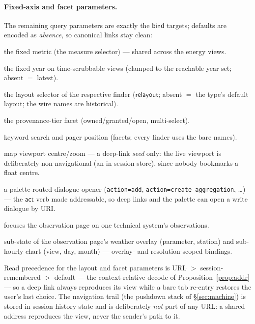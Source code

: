 \documentclass[11pt,a4paper]{article}
\theoremstyle{remark}
\newcommand{\vbind}{\mathsf{bind}}
\newcommand{\vrelayout}{\mathsf{relayout}}
\newcommand{\vact}{\mathsf{act}}
\begin{document}
\paragraph{Fixed-axis and facet parameters.} The remaining query parameters are
exactly the $\vbind$ targets; defaults are encoded as \emph{absence}, so
canonical links stay clean:

\begin{description}\setlength\itemsep{1pt}
\item[\texttt{m}] the fixed metric (the measure selector) --- shared across the
  energy views.
\item[\texttt{y}] the fixed year on time-scrubbable views (clamped to the
  reachable year set; absent $=$ latest).
\item[\texttt{view} / \texttt{space} / \texttt{guise}] the layout selector of the
  respective finder ($\vrelayout$; absent $=$ the type's default layout; the
  wire names are historical).
\item[\texttt{tiers}] the provenance-tier facet (owned/granted/open, multi-select).
\item[\texttt{q} / \texttt{offset}] keyword search and pager position (facets;
  every finder uses the bare names).
\item[\texttt{c} / \texttt{z}] map viewport centre/zoom --- a deep-link
  \emph{seed} only: the live viewport is deliberately non-navigational (an
  in-session store), since nobody bookmarks a float centre.
\item[\texttt{action}] a palette-routed dialogue opener (\texttt{action=add},
  \texttt{action=create-aggregation}, \ldots) --- the $\vact$ verb made
  addressable, so deep links and the palette can open a write dialogue by URI.
\item[\texttt{unit}] focuses the observation page on one technical system's
  observations.
\item[\texttt{wp} / \texttt{ws}; \texttt{tab} / \texttt{day} / \texttt{month}]
  sub-state of the observation page's weather overlay (parameter, station) and
  sub-hourly chart (view, day, month) --- overlay- and resolution-scoped
  bindings.
\end{description}

Read precedence for the layout and facet parameters is URL $>$ session-remembered
$>$ default --- the context-relative decode of Proposition~\ref{prop:addr} --- so
a deep link always reproduces its view while a bare tab re-entry restores the
user's last choice. The navigation trail (the pushdown stack of
\S\ref{sec:machine}) is stored in session history state and is deliberately
\emph{not} part of any URL: a shared address reproduces the view, never the
sender's path to it.
\end{document}
